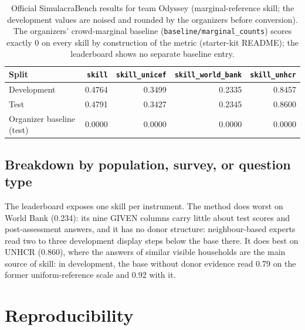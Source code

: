 \documentclass{article}
\newcommand{\teamid}{Odyssey}
\begin{document}
\begin{table}[h]
  \centering
  \small
  \caption{Official SimulacraBench results for team \teamid{} (marginal-reference skill; the
  development values are noised and rounded by the organizers before conversion). The
  organizers' crowd-marginal baseline (\texttt{baseline/marginal\_counts}) scores exactly 0
  on every skill by construction of the metric (starter-kit README); the leaderboard shows no
  separate baseline entry.}
  \label{tab:results}
  \begin{tabular}{lrrrr}
    \toprule
    Split & \texttt{skill} & \texttt{skill\_unicef} & \texttt{skill\_world\_bank} & \texttt{skill\_unhcr} \\
    \midrule
    Development & 0.4764 & 0.3499 & 0.2335 & 0.8457 \\
    Test        & 0.4791 & 0.3427 & 0.2345 & 0.8600 \\
    Organizer baseline (test) & 0.0000 & 0.0000 & 0.0000 & 0.0000 \\
    \bottomrule
  \end{tabular}
\end{table}

\subsection{Breakdown by population, survey, or question type}
The leaderboard exposes one skill per instrument. The method does worst on World Bank
(0.234): its nine GIVEN columns carry little about test scores and post-assessment answers,
and it has no donor structure: neighbour-based experts read two to three development
display steps below the base there. It does best on UNHCR (0.860), where the answers of
similar visible households are the main source of skill: in development, the base without
donor evidence read 0.79 on the former uniform-reference scale and 0.92 with it.

\section{Reproducibility}
\label{sec:repro}
\end{document}
